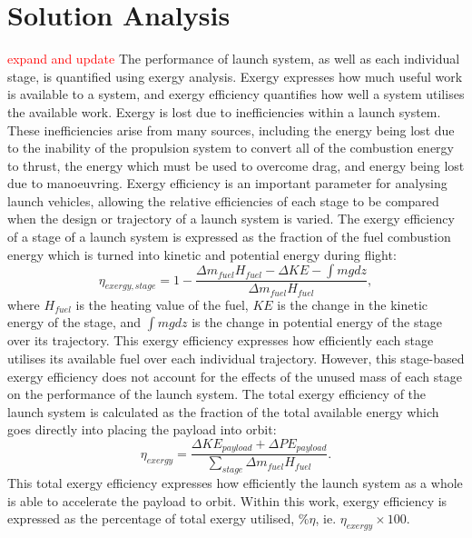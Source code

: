 \section{Solution Analysis}
\textcolor{red}{expand and update}
The performance of launch system, as well as each individual stage, is quantified using exergy analysis. Exergy expresses how much useful work is available to a system, and exergy efficiency quantifies how well a system utilises the available work. Exergy is lost due to inefficiencies within a launch system. These inefficiencies arise from many sources, including the energy being lost due to the inability of the propulsion system to convert all of the combustion energy to thrust, the energy which must be used to overcome drag, and energy being lost due to manoeuvring. Exergy efficiency is an important parameter for analysing launch vehicles, allowing the relative efficiencies of each stage to be compared when the design or trajectory of a launch system is varied\cite{Gilbert2015}. The exergy efficiency of a stage of a launch system is expressed as the fraction of the fuel combustion energy which is turned into kinetic and potential energy during flight:
\begin{equation}
\eta_{exergy,stage} = 1 - \frac{\Delta m_{fuel}H_{fuel} - \Delta KE - \int mg dz}{\Delta m_{fuel}H_{fuel}},
\end{equation}
where $H_{fuel}$ is the heating value of the fuel, $KE$ is the change in the kinetic energy of the stage, and $\int mg dz$ is the change in potential energy of the stage over its trajectory.
This exergy efficiency expresses how efficiently each stage utilises its available fuel over each individual trajectory. However, this stage-based exergy efficiency does not account for the effects of the unused mass of each stage on the performance of the launch system. The total exergy efficiency of the launch system is calculated as the fraction of the total available energy which goes directly into placing the payload into orbit:
\begin{equation}
\eta_{exergy} = \frac{\Delta KE_{payload} + \Delta PE_{payload}}{\sum_{stage} \Delta m_{fuel}H_{fuel}}.
\end{equation}
This total exergy efficiency expresses how efficiently the launch system as a whole is able to accelerate the payload to orbit. 
Within this work, exergy efficiency is expressed as the percentage of total exergy utilised, \%$\eta$, ie. $\eta_{exergy} \times 100$.


